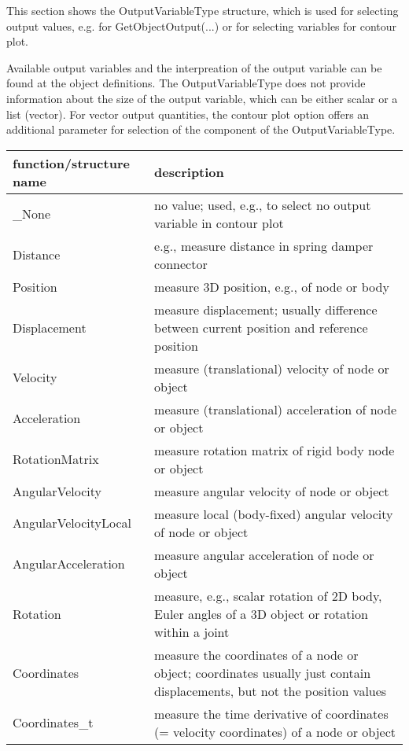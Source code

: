 This section shows the OutputVariableType structure, which is used for selecting output values, e.g. for GetObjectOutput(...) or for selecting variables for contour plot.

Available output variables and the interpreation of the output variable can be found at the object definitions. 
 The OutputVariableType does not provide information about the size of the output variable, which can be either scalar or a list (vector). For vector output quantities, the contour plot option offers an additional parameter for selection of the component of the OutputVariableType.


\begin{center}
\footnotesize
\begin{longtable}{| p{8cm} | p{8cm} |} 
\hline
{\bf function/structure name} & {\bf description}\\ \hline
  \_None & no value; used, e.g., to select no output variable in contour plot\\ \hline 
  Distance & e.g., measure distance in spring damper connector\\ \hline 
  Position & measure 3D position, e.g., of node or body\\ \hline 
  Displacement & measure displacement; usually difference between current position and reference position\\ \hline 
  Velocity & measure (translational) velocity of node or object\\ \hline 
  Acceleration & measure (translational) acceleration of node or object\\ \hline 
  RotationMatrix & measure rotation matrix of rigid body node or object\\ \hline 
  AngularVelocity & measure angular velocity of node or object\\ \hline 
  AngularVelocityLocal & measure local (body-fixed) angular velocity of node or object\\ \hline 
  AngularAcceleration & measure angular acceleration of node or object\\ \hline 
  Rotation & measure, e.g., scalar rotation of 2D body, Euler angles of a 3D object or rotation within a joint\\ \hline 
  Coordinates & measure the coordinates of a node or object; coordinates usually just contain displacements, but not the position values\\ \hline 
  Coordinates\_t & measure the time derivative of coordinates (= velocity coordinates) of a node or object\\ \hline 

\end{longtable}
\end{center}
